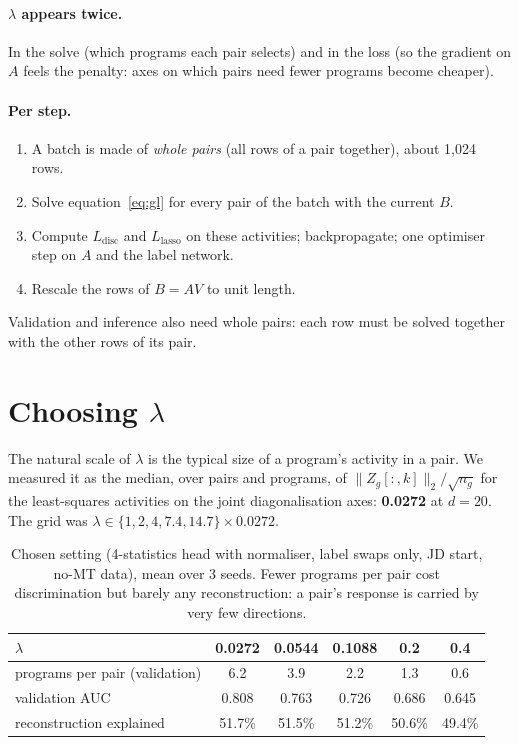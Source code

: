 \documentclass[11pt]{article}
\begin{document}
\paragraph{$\lambda$ appears twice.} In the solve (which programs each pair
selects) and in the loss (so the gradient on $A$ feels the penalty: axes on which
pairs need fewer programs become cheaper).

\paragraph{Per step.}
\begin{enumerate}
  \item A batch is made of \emph{whole pairs} (all rows of a pair together),
  about 1{,}024 rows.
  \item Solve equation~\eqref{eq:gl} for every pair of the batch with the
  current $B$.
  \item Compute $L_\text{disc}$ and $L_\text{lasso}$ on these activities;
  backpropagate; one optimiser step on $A$ and the label network.
  \item Rescale the rows of $B=AV$ to unit length.
\end{enumerate}
Validation and inference also need whole pairs: each row must be solved
together with the other rows of its pair.

\section{Choosing $\lambda$}

The natural scale of $\lambda$ is the typical size of a program's activity in a
pair. We measured it as the median, over pairs and programs, of
$\|Z_g[:,k]\|_2/\sqrt{n_g}$ for the least-squares activities on the joint
diagonalisation axes: \textbf{0.0272} at $d=20$. The grid was
$\lambda\in\{1,2,4,7.4,14.7\}\times 0.0272$.

\begin{table}[h]
\centering\small
\begin{tabular}{lccccc}
\toprule
$\lambda$ & 0.0272 & 0.0544 & 0.1088 & 0.2 & 0.4 \\
\midrule
programs per pair (validation) & 6.2 & 3.9 & 2.2 & 1.3 & 0.6 \\
validation AUC & 0.808 & 0.763 & 0.726 & 0.686 & 0.645 \\
reconstruction explained & 51.7\% & 51.5\% & 51.2\% & 50.6\% & 49.4\% \\
\bottomrule
\end{tabular}
\caption{Chosen setting (4-statistics head with normaliser, label swaps only, JD
start, no-MT data), mean over 3 seeds. Fewer programs per pair cost
discrimination but barely any reconstruction: a pair's response is carried by
very few directions.}
\end{table}
\end{document}
